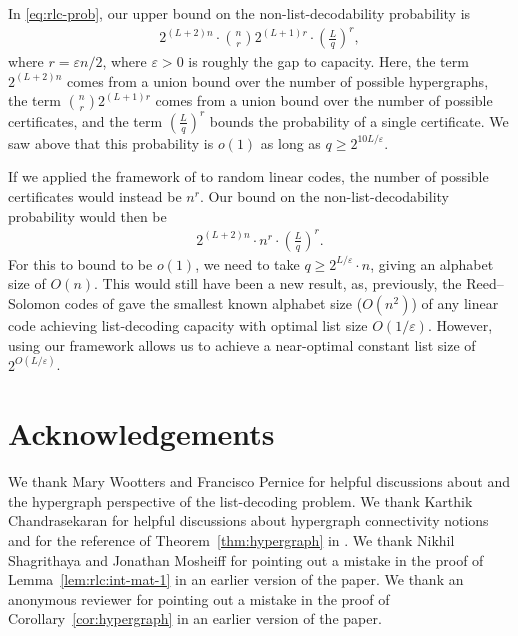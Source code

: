 \documentclass{article}[11pt]
\begin{document}
In \eqref{eq:rlc-prob}, our upper bound on the non-list-decodability probability is
\begin{align}
  2^{(L+2)n} \cdot \binom{n}{r} 2^{(L+1)r} \cdot \left( \frac{L}{q} \right)^r,
  \label{}
\end{align}
where $r=\varepsilon n/2$, where $\varepsilon>0$ is roughly the gap to capacity.
Here, the term $2^{(L+2)n}$ comes from a union bound over the number of possible hypergraphs, the term $\binom{n}{r}2^{(L+1)r}$ comes from a union bound over the number of possible certificates, and the term $\left( \frac{L}{q} \right)^r$ bounds the probability of a single certificate.
We saw above that this probability is $o(1)$ as long as $q\ge 2^{10L/\varepsilon}$.

If we applied the framework of \cite{GZ23} to random linear codes, the number of possible certificates would instead be $n^r$.
Our bound on the non-list-decodability probability would then be
\begin{align}
  2^{(L+2)n} \cdot n^r \cdot \left( \frac{L}{q} \right)^r.
\end{align}
For this to bound to be $o(1)$, we need to take $q \ge 2^{L/\varepsilon}\cdot n$, giving an alphabet size of $O(n)$.
This would still have been a new result, as, previously, the Reed--Solomon codes of \cite{GZ23} gave the smallest known alphabet size ($O(n^2)$) of any linear code achieving list-decoding capacity with optimal list size $O(1/\varepsilon)$.
However, using our framework allows us to achieve a near-optimal constant list size of $2^{O(L/\varepsilon)}$.




















\section*{Acknowledgements}

We thank Mary Wootters and Francisco Pernice for helpful discussions about \cite{BGM23} and the hypergraph perspective of the list-decoding problem.
We thank Karthik Chandrasekaran for helpful discussions about hypergraph connectivity notions and for the reference of Theorem~\ref{thm:hypergraph} in \cite{Frank11}.
We thank Nikhil Shagrithaya and Jonathan Mosheiff for pointing out a mistake in the proof of Lemma~\ref{lem:rlc:int-mat-1} in an earlier version of the paper.
We thank an anonymous reviewer for pointing out a mistake in the proof of Corollary~\ref{cor:hypergraph} in an earlier version of the paper.
\end{document}

